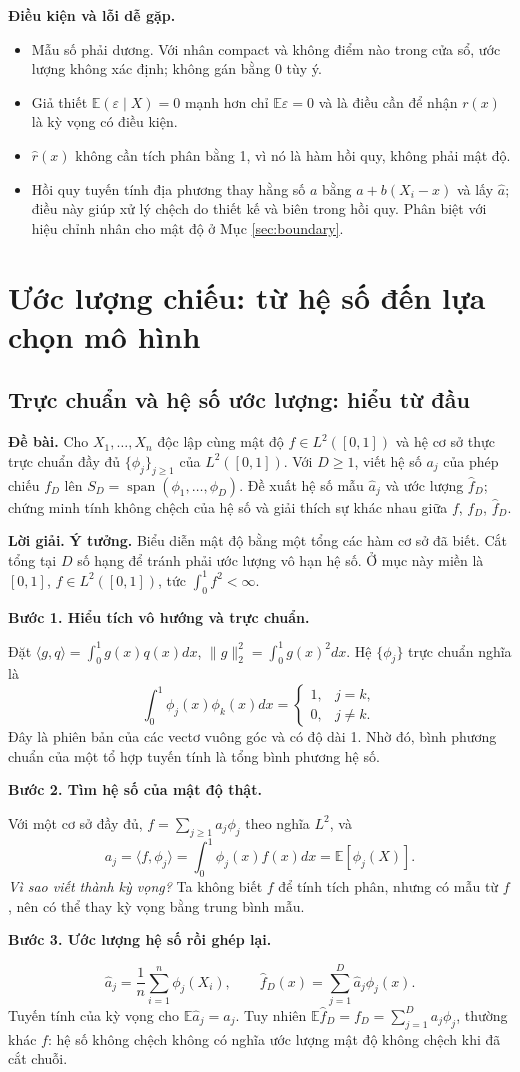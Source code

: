 \documentclass[11pt,a4paper]{article}
\newcommand{\E}{\mathbb E}
\newcommand{\buoc}[1]{\par\medskip\textbf{#1}\par}
\begin{document}
\textbf{Điều kiện và lỗi dễ gặp.}
\begin{itemize}
\item Mẫu số phải dương. Với nhân compact và không điểm nào trong cửa sổ, ước lượng không xác định; không gán bằng 0 tùy ý.
\item Giả thiết $\E(\varepsilon\mid X)=0$ mạnh hơn chỉ $\E\varepsilon=0$ và là điều cần để nhận $r(x)$ là kỳ vọng có điều kiện.
\item $\widehat r(x)$ không cần tích phân bằng 1, vì nó là hàm hồi quy, không phải mật độ.
\item Hồi quy tuyến tính địa phương thay hằng số $a$ bằng $a+b(X_i-x)$ và lấy $\widehat a$; điều này giúp xử lý chệch do thiết kế và biên trong hồi quy. Phân biệt với hiệu chỉnh nhân cho mật độ ở Mục \ref{sec:boundary}.
\end{itemize}

\section{Ước lượng chiếu: từ hệ số đến lựa chọn mô hình}\label{sec:projection}
\subsection{Trực chuẩn và hệ số ước lượng: hiểu từ đầu}
\textbf{Đề bài.} Cho $X_1,\ldots,X_n$ độc lập cùng mật độ $f\in L^2([0,1])$
và hệ cơ sở thực trực chuẩn đầy đủ $\{\phi_j\}_{j\geq1}$ của $L^2([0,1])$.
Với $D\geq1$, viết hệ số $a_j$ của phép chiếu $f_D$ lên
$S_D=\operatorname{span}(\phi_1,\ldots,\phi_D)$.
Đề xuất hệ số mẫu $\widehat a_j$ và ước lượng $\widehat f_D$;
chứng minh tính không chệch của hệ số và giải thích sự khác nhau giữa $f$, $f_D$, $\widehat f_D$.

\textbf{Lời giải.}
\textbf{Ý tưởng.} Biểu diễn mật độ bằng một tổng các hàm cơ sở đã biết. Cắt tổng tại $D$ số hạng để tránh phải ước lượng vô hạn hệ số. Ở mục này miền là $[0,1]$, $f\in L^2([0,1])$, tức $\int_0^1f^2<\infty$.
\buoc{Bước 1. Hiểu tích vô hướng và trực chuẩn.}
Đặt $\langle g,q\rangle=\int_0^1g(x)q(x)dx$, $\|g\|_2^2=\int_0^1g(x)^2dx$. Hệ $\{\phi_j\}$ trực chuẩn nghĩa là
\[
\int_0^1\phi_j(x)\phi_k(x)dx=
\begin{cases}1,&j=k,\\0,&j\ne k.\end{cases}
\]
Đây là phiên bản của các vectơ vuông góc và có độ dài 1. Nhờ đó, bình phương chuẩn của một tổ hợp tuyến tính là tổng bình phương hệ số.
\buoc{Bước 2. Tìm hệ số của mật độ thật.}
Với một cơ sở đầy đủ, $f=\sum_{j\geq1}a_j\phi_j$ theo nghĩa $L^2$, và
\[
a_j=\langle f,\phi_j\rangle=\int_0^1\phi_j(x)f(x)dx=\E[\phi_j(X)].
\]
\textit{Vì sao viết thành kỳ vọng?} Ta không biết $f$ để tính tích phân, nhưng có mẫu từ $f$, nên có thể thay kỳ vọng bằng trung bình mẫu.
\buoc{Bước 3. Ước lượng hệ số rồi ghép lại.}
\[
\boxed{\widehat a_j=\frac1n\sum_{i=1}^n\phi_j(X_i),\qquad
\widehat f_D(x)=\sum_{j=1}^D\widehat a_j\phi_j(x).}
\]
Tuyến tính của kỳ vọng cho $\E\widehat a_j=a_j$. Tuy nhiên $\E\widehat f_D=f_D=\sum_{j=1}^Da_j\phi_j$, thường khác $f$: hệ số không chệch không có nghĩa ước lượng mật độ không chệch khi đã cắt chuỗi.
\end{document}
